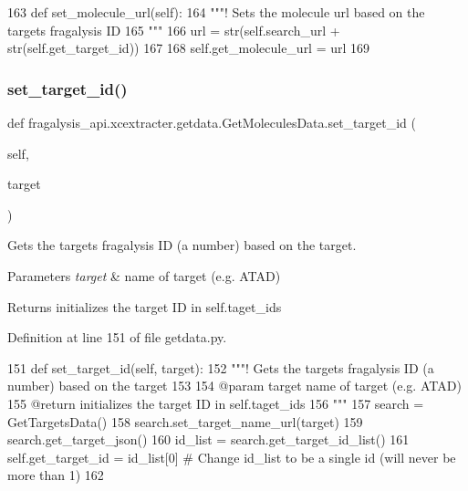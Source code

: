 \begin{DoxyCode}
163     \textcolor{keyword}{def }set\_molecule\_url(self):
164         \textcolor{stringliteral}{"""! Sets the molecule url based on the targets fragalysis ID}
165 \textcolor{stringliteral}{        """}
166         url = str(self.search\_url + str(self.get\_target\_id))
167 
168         self.get\_molecule\_url = url
169 
\end{DoxyCode}
\mbox{\label{classfragalysis__api_1_1xcextracter_1_1getdata_1_1_get_molecules_data_acc782fb40405a434903f6d3e80624c9c}} 
\subsubsection{\texorpdfstring{set\+\_\+target\+\_\+id()}{set\_target\_id()}}
{\footnotesize\ttfamily def fragalysis\+\_\+api.\+xcextracter.\+getdata.\+Get\+Molecules\+Data.\+set\+\_\+target\+\_\+id (\begin{DoxyParamCaption}\item[{}]{self,  }\item[{}]{target }\end{DoxyParamCaption})}



Gets the targets fragalysis ID (a number) based on the target. 


\begin{DoxyParams}{Parameters}
{\em target} & name of target (e.\+g. A\+T\+AD) \\
\hline
\end{DoxyParams}
\begin{DoxyReturn}{Returns}
initializes the target ID in self.\+taget\+\_\+ids 
\end{DoxyReturn}


Definition at line 151 of file getdata.\+py.


\begin{DoxyCode}
151     \textcolor{keyword}{def }set\_target\_id(self, target):
152         \textcolor{stringliteral}{"""! Gets the targets fragalysis ID (a number) based on the target}
153 \textcolor{stringliteral}{}
154 \textcolor{stringliteral}{        @param target name of target (e.g. ATAD)}
155 \textcolor{stringliteral}{        @return initializes the target ID in self.taget\_ids}
156 \textcolor{stringliteral}{        """}
157         search = GetTargetsData()
158         search.set\_target\_name\_url(target)
159         search.get\_target\_json()
160         id\_list = search.get\_target\_id\_list()
161         self.get\_target\_id = id\_list[0]  \textcolor{comment}{# Change id\_list to be a single id (will never be more than 1)}
162 
\end{DoxyCode}


